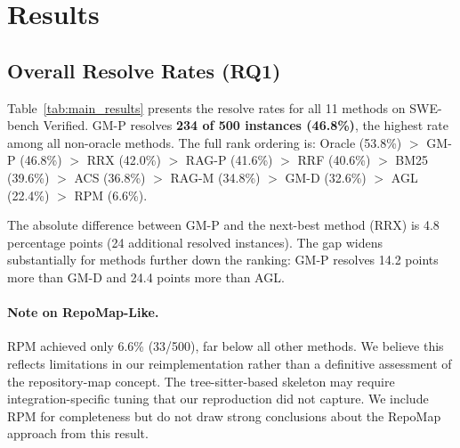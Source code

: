 \section{Results}
\label{sec:results}

\subsection{Overall Resolve Rates (RQ1)}

Table~\ref{tab:main_results} presents the resolve rates for all 11 methods on SWE-bench Verified. GM-P resolves \textbf{234 of 500 instances (46.8\%)}, the highest rate among all non-oracle methods. The full rank ordering is: Oracle (53.8\%) $>$ GM-P (46.8\%) $>$ RRX (42.0\%) $>$ RAG-P (41.6\%) $>$ RRF (40.6\%) $>$ BM25 (39.6\%) $>$ ACS (36.8\%) $>$ RAG-M (34.8\%) $>$ GM-D (32.6\%) $>$ AGL (22.4\%) $>$ RPM (6.6\%).

The absolute difference between GM-P and the next-best method (RRX) is 4.8 percentage points (24 additional resolved instances). The gap widens substantially for methods further down the ranking: GM-P resolves 14.2 points more than GM-D and 24.4 points more than AGL.

\paragraph{Note on RepoMap-Like.} RPM achieved only 6.6\% (33/500), far below all other methods. We believe this reflects limitations in our reimplementation rather than a definitive assessment of the repository-map concept. The tree-sitter-based skeleton may require integration-specific tuning that our reproduction did not capture. We include RPM for completeness but do not draw strong conclusions about the RepoMap approach from this result.

